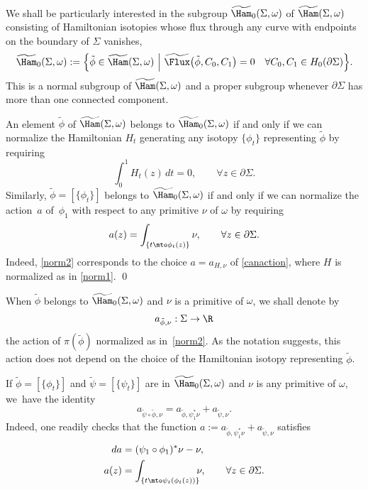 We shall be particularly interested in the subgroup $\widetilde{\Ham}_0(\Sigma,\omega)$ of $\widetilde\Ham(\Sigma,\omega)$ consisting of Hamiltonian isotopies whose flux through any curve with endpoints on the boundary of $\Sigma$ vanishes, \ie
\[
\widetilde{\Ham}_0(\Sigma,\omega) := \Big\{ \tilde{\phi} \in \widetilde{\Ham}(\Sigma,\omega) \ \Big|\ \widetilde{\Flux} \bigl(\tilde{\phi}, C_0,C_1 \bigr) = 0 \quad \forall C_0,C_1 \in H_0(\partial \Sigma) \Big\}.
\]
This is a normal subgroup of $\widetilde{\Ham}(\Sigma,\omega)$ and a proper subgroup whenever $\partial \Sigma$ has more than one connected component.

\begin{rem}
\label{whenflux0}
An element $\tilde{\phi}$ of $\widetilde{\Ham}(\Sigma,\omega)$ belongs to $\widetilde{\Ham}_0(\Sigma,\omega)$ if and only if we can normalize the Hamiltonian $H_t$ generating any isotopy $\{\phi_t\}$ representing $\tilde{\phi}$ by requiring
\begin{equation}
\label{norm1}
\int_0^1 H_t(z)\, dt = 0, \qquad \forall z\in \partial \Sigma.
\end{equation}
Similarly, $\tilde{\phi}=[\{\phi_t\}]$ belongs to $\widetilde{\Ham}_0(\Sigma,\omega)$ if and only if we can normalize the action~$a$ of~$\phi_1$ with respect to any primitive $\nu$ of $\omega$ by requiring
\begin{equation}
\label{norm2}
a(z) = \int_{\{t\mto \phi_t(z)\}} \nu, \qquad \forall z\in \partial \Sigma.
\end{equation}
Indeed, \eqref{norm2} corresponds to the choice $a=a_{H,\nu}$ of \eqref{canaction}, where $H$ is normalized as in \eqref{norm1}.
\hfill\qed
\end{rem}

When $\tilde{\phi}$ belongs to $\widetilde{\Ham}_0(\Sigma,\omega)$ and $\nu$ is a primitive of $\omega$, we shall denote by
\[
a_{\tilde{\phi},\nu} : \Sigma \to \R
\]
the action of $\pi(\tilde\phi)$ normalized as in~\eqref{norm2}. As the notation suggests, this action does not depend on the choice of the Hamiltonian isotopy representing $\tilde{\phi}$.

If $\tilde{\phi} = [\{\phi_t\}]$ and $\tilde{\psi} = [\{\psi_t\}]$ are in $\widetilde{\Ham}_0(\Sigma,\omega)$ and $\nu$ is any primitive of $\omega$, we~have the identity
\begin{equation}
\label{composition}
a_{\tilde{\psi} \circ \tilde{\phi}, \nu} = a_{\tilde{\phi}, \psi_1^* \nu} + a_{\tilde{\psi},\nu}.
\end{equation}
Indeed, one readily checks that the function $a:=a_{\tilde{\phi}, \psi_1^* \nu} + a_{\tilde{\psi},\nu}$ satisfies
\begin{align*}
da &= (\psi_1 \circ \phi_1)^* \nu - \nu,\\
a(z)&= \int_{\{t\mto \psi_t(\phi_t(z))\}}\!\!\!\nu, \qquad \forall z\in \partial \Sigma.
\end{align*}

